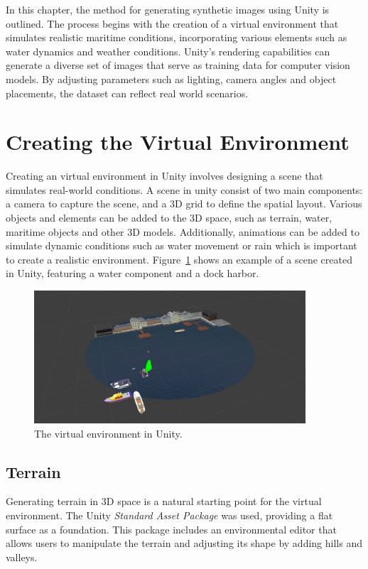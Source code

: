 
In this chapter, the method for generating synthetic images using Unity is outlined. The process begins with the creation of a virtual environment that simulates realistic maritime conditions, incorporating various elements such as water dynamics and weather conditions. Unity's rendering capabilities can generate a diverse set of images that serve as training data for computer vision models. By adjusting parameters such as lighting, camera angles and object placements, the dataset can reflect real world scenarios. 


\section{Creating the Virtual Environment}
Creating an virtual environment in Unity involves designing a scene that simulates real-world conditions. A scene in unity consist of two main components: a camera to capture the scene, and a 3D grid to define the spatial layout. Various objects and elements can be added to the 3D space, such as terrain, water, maritime objects and other 3D models. Additionally, animations can be added to simulate dynamic conditions such as water movement or rain which is important to create a realistic environment. Figure~\ref{fig:environment} shows an example of a scene created in Unity, featuring a water component and a dock harbor.

\begin{figure}[H]
    \centering
    \includegraphics[width=0.9\textwidth]{Figures/method/environment2.png}
    \caption{The virtual environment in Unity.}
    \label{fig:environment}
    
\end{figure}
 
\subsection{Terrain}
Generating terrain in 3D space is a natural starting point for the virtual environment. The Unity \textit{Standard Asset Package} \cite{unity_standard_assets_installation} was used, providing a flat surface as a foundation. This package includes an environmental editor that allows users to manipulate the terrain and adjusting its shape by adding hills and valleys.

